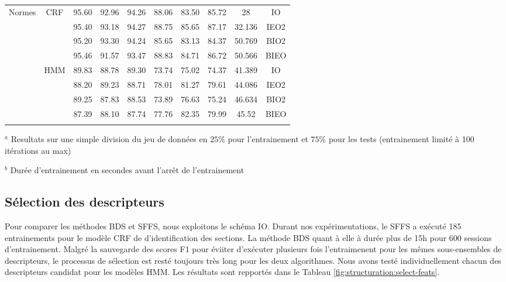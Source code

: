 \begin{table}[h]
\begin{center}
\begin{tabular}{p{0.9cm}|c|cccccccc}
\multirow{8}{*}{Normes}  & \multirow{4}{*}{CRF} & 95.60 & 92.96 & 94.26 & 88.06 & 83.50 & 85.72 & 28 & IO \\%
&  & 95.40 & 93.18 & 94.27 & 88.75 & 85.65 & 87.17 & 32.136 & IEO2 \\
 &  & 95.20 & 93.30 & 94.24 & 85.65 & 83.13 & 84.37 & 50.769 & BIO2 \\
  &  & 95.46 & 91.57 & 93.47 & 88.83 & 84.71 & 86.72 & 50.566 & BIEO \\ \cline{2-10}
  & \multirow{4}{*}{HMM} & 89.83 & 88.78 & 89.30 & 73.74 & 75.02 & 74.37 &  41.389 & IO \\%
   &  & 88.20 & 89.23 & 88.71 & 78.01 & 81.27 & 79.61 & 44.086 & IEO2 \\
  &  & 89.25 & 87.83 & 88.53 & 73.89 & 76.63 & 75.24 & 46.634 & BIO2 \\
  &  & 87.39 & 88.10 & 87.74 & 77.76 & 82.35 & 79.99 & 45.52& BIEO \\ 
\noalign{\smallskip}\hline\noalign{\smallskip}
\end{tabular}
\end{center}

$^a$ Resultats sur une simple division du jeu de données en $25\%$ pour l'entrainement et  $75\%$ pour les tests (entrainement limité à 100 itérations au max)

$^b$ Durée d'entrainement en secondes avant l'arrêt de l'entrainement
\end{table}


\subsection{Sélection des descripteurs}
Pour comparer les méthodes BDS et SFFS, nous exploitons le schéma IO. Durant nos expérimentations, le SFFS a exécuté 185 entrainements pour le modèle CRF de d'identification des sections. La méthode BDS quant à elle à durée plus de 15h pour 600 sessions d'entrainement. Malgré la sauvegarde des scores F1 pour éviiter d'exécuter plusieurs fois l'entraimenent pour les mêmes sous-ensembles de descripteurs, le processus de sélection est resté toujours très long pour les deux algorithmes. Nous avons testé individuellement chacun des descripteurs candidat pour les modèles HMM. Les résultats sont repportés dans le Tableau \ref{fig:structuration:select-feats}.

